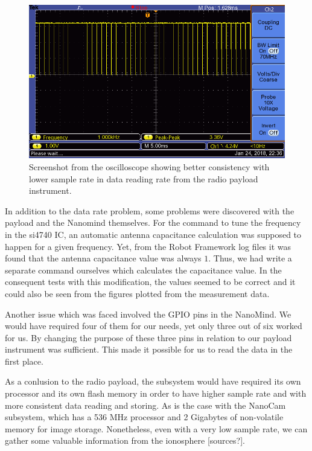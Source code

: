 \documentclass[english,12pt,a4paper,pdftex,elec,utf8]{aaltothesis}
\begin{document}
\begin{figure}[h!]
\centering
\includegraphics[scale=0.5]{F0003TEK}
\caption{Screenshot from the oscilloscope showing better consistency with lower sample rate in data reading rate from the radio payload instrument.}
\label{payloadosc2}
\end{figure}
In addition to the data rate problem, some problems were discovered with the payload and the Nanomind themselves. For the command to tune the frequency in the si4740 IC, an automatic antenna capacitance calculation was supposed to happen for a given frequency. Yet, from the Robot Framework log files it was found that the antenna capacitance value was always $1$. Thus, we had write a separate command ourselves which calculates the capacitance value. In the consequent tests with this modification, the values seemed to be correct and it could also be seen from the figures plotted from the measurement data.\par 
Another issue which was faced involved the GPIO pins in the NanoMind. We would have required four of them for our needs, yet only three out of six worked for us. By changing the purpose of these three pins in relation to our payload instrument was sufficient. This made it possible for us to read the data in the first place.\par 
As a conlusion to the radio payload, the subsystem would have required its own processor and its own flash memory in order to have higher sample rate and with more consistent data reading and storing. As is the case with the NanoCam subsystem, which has a 536 MHz processor and 2 Gigabytes of non-volatile memory for image storage. Nonetheless, even with a very low sample rate, we can gather some valuable information from the ionosphere [sources?].    
\end{document}
